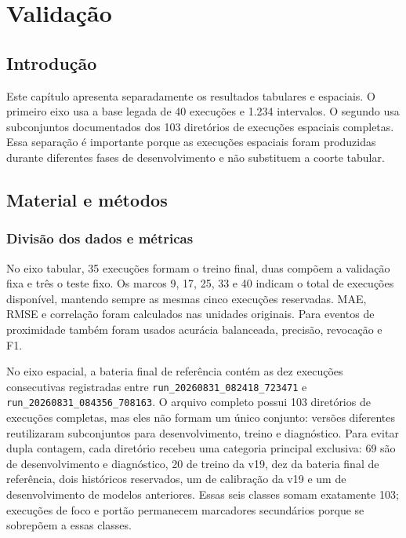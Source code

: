\chapter{Validação}\label{cap:validacao}

\section{Introdução}

Este capítulo apresenta separadamente os resultados tabulares e espaciais. O primeiro eixo usa a base legada de 40 execuções e 1.234 intervalos. O segundo usa subconjuntos documentados dos 103 diretórios de execuções espaciais completas. Essa separação é importante porque as execuções espaciais foram produzidas durante diferentes fases de desenvolvimento e não substituem a coorte tabular.

\section{Material e métodos}

\subsection{Divisão dos dados e métricas}

No eixo tabular, 35 execuções formam o treino final, duas compõem a validação fixa e três o teste fixo. Os marcos 9, 17, 25, 33 e 40 indicam o total de execuções disponível, mantendo sempre as mesmas cinco execuções reservadas. MAE, RMSE e correlação foram calculados nas unidades originais. Para eventos de proximidade também foram usados acurácia balanceada, precisão, revocação e F1.

No eixo espacial, a bateria final de referência contém as dez execuções consecutivas registradas entre \texttt{run\_20260831\_082418\_723471} e \texttt{run\_20260831\_084356\_708163}. O arquivo completo possui 103 diretórios de execuções completas, mas eles não formam um único conjunto: versões diferentes reutilizaram subconjuntos para desenvolvimento, treino e diagnóstico. Para evitar dupla contagem, cada diretório recebeu uma categoria principal exclusiva: 69 são de desenvolvimento e diagnóstico, 20 de treino da v19, dez da bateria final de referência, dois históricos reservados, um de calibração da v19 e um de desenvolvimento de modelos anteriores. Essas seis classes somam exatamente 103; execuções de foco e portão permanecem marcadores secundários porque se sobrepõem a essas classes.

